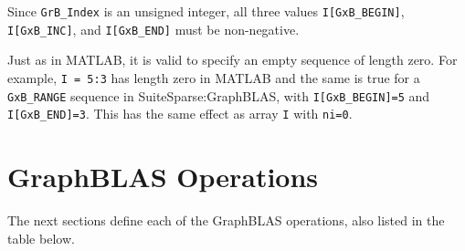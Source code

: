 \documentclass[12pt]{article}
\begin{document}
{\begin{enumerate}
\end{enumerate}

Since \verb'GrB_Index' is an unsigned integer, all three values
\verb'I[GxB_BEGIN]', \verb'I[GxB_INC]', and \verb'I[GxB_END]' must
be non-negative.

Just as in MATLAB, it is valid to specify an empty sequence of length zero.
For example, \verb'I = 5:3' has length zero in MATLAB and the same is
true for a \verb'GxB_RANGE' sequence in SuiteSparse:GraphBLAS, with
\verb'I[GxB_BEGIN]=5' and \verb'I[GxB_END]=3'.  This has the same
effect as array \verb'I' with \verb'ni=0'.

\newpage
\section{GraphBLAS Operations} %
\label{operations}

The next sections define each of the GraphBLAS operations, also listed in the
table below.

}
\end{document}
